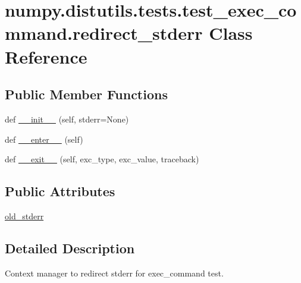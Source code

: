 \hypertarget{classnumpy_1_1distutils_1_1tests_1_1test__exec__command_1_1redirect__stderr}{}\section{numpy.\+distutils.\+tests.\+test\+\_\+exec\+\_\+command.\+redirect\+\_\+stderr Class Reference}
\label{classnumpy_1_1distutils_1_1tests_1_1test__exec__command_1_1redirect__stderr}
\subsection*{Public Member Functions}
\begin{DoxyCompactItemize}
\item 
def \hyperlink{classnumpy_1_1distutils_1_1tests_1_1test__exec__command_1_1redirect__stderr_a0610379dfdfbcd97b8851646d2478bf6}{\+\_\+\+\_\+init\+\_\+\+\_\+} (self, stderr=None)
\item 
def \hyperlink{classnumpy_1_1distutils_1_1tests_1_1test__exec__command_1_1redirect__stderr_a99378aa0674dc596a5e94e9097da3683}{\+\_\+\+\_\+enter\+\_\+\+\_\+} (self)
\item 
def \hyperlink{classnumpy_1_1distutils_1_1tests_1_1test__exec__command_1_1redirect__stderr_ab3d1a39df45bc98822a190fc2288227d}{\+\_\+\+\_\+exit\+\_\+\+\_\+} (self, exc\+\_\+type, exc\+\_\+value, traceback)
\end{DoxyCompactItemize}
\subsection*{Public Attributes}
\begin{DoxyCompactItemize}
\item 
\hyperlink{classnumpy_1_1distutils_1_1tests_1_1test__exec__command_1_1redirect__stderr_a10ec7b5da03d1671b17eab6799034b3d}{old\+\_\+stderr}
\end{DoxyCompactItemize}


\subsection{Detailed Description}
\begin{DoxyVerb}Context manager to redirect stderr for exec_command test.\end{DoxyVerb}
 

